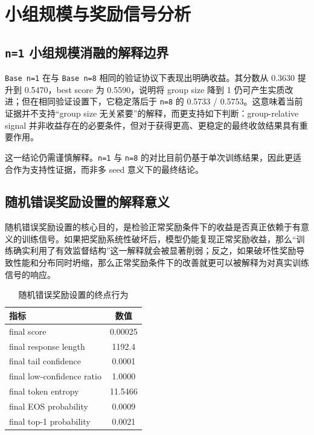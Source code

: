 \documentclass[12pt,a4paper]{ctexart}
\begin{document}
\section{小组规模与奖励信号分析}

\subsection{\texttt{n=1} 小组规模消融的解释边界}

\texttt{Base n=1} 在与 \texttt{Base n=8} 相同的验证协议下表现出明确收益。其分数从 0.3630 提升到 0.5470，best score 为 0.5590，说明将 group size 降到 1 仍可产生实质改进；但在相同验证设置下，它稳定落后于 \texttt{n=8} 的 0.5733 / 0.5753。这意味着当前证据并不支持“group size 无关紧要”的解释，而更支持如下判断：group-relative signal 并非收益存在的必要条件，但对于获得更高、更稳定的最终收敛结果具有重要作用。

这一结论仍需谨慎解释。\texttt{n=1} 与 \texttt{n=8} 的对比目前仍基于单次训练结果，因此更适合作为支持性证据，而非多 seed 意义下的最终结论。

\subsection{随机错误奖励设置的解释意义}

随机错误奖励设置的核心目的，是检验正常奖励条件下的收益是否真正依赖于有意义的训练信号。如果把奖励系统性破坏后，模型仍能复现正常奖励收益，那么“训练确实利用了有效监督结构”这一解释就会被显著削弱；反之，如果破坏性奖励导致性能和分布同时坍缩，那么正常奖励条件下的改善就更可以被解释为对真实训练信号的响应。

\begin{table}[H]
    \centering
    \caption{随机错误奖励设置的终点行为}
    \label{tab:random-reward-endpoint}
    \begin{tabular}{lc}
        \toprule
        指标 & 数值 \\
        \midrule
        final score & 0.00025 \\
        final response length & 1192.4 \\
        final tail confidence & 0.0001 \\
        final low-confidence ratio & 1.0000 \\
        final token entropy & 11.5466 \\
        final EOS probability & 0.0009 \\
        final top-1 probability & 0.0021 \\
        \bottomrule
    \end{tabular}
\end{table}
\end{document}
